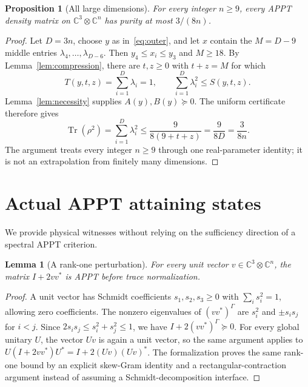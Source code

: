 \documentclass[11pt]{article}
\newtheorem{lemma}[theorem]{Lemma}
\newtheorem{proposition}[theorem]{Proposition}
\theoremstyle{remark}\newtheorem{remark}[theorem]{Remark}
\newcommand{\Tr}{\operatorname{Tr}}
\newcommand{\C}{\mathbb C}
\begin{document}
\begin{proposition}[All large dimensions]\label{prop:large}
For every integer $n\geq9$, every APPT density matrix on $\C^3\otimes\C^n$ has purity at most $3/(8n)$.
\end{proposition}
\begin{proof}
Let $D=3n$, choose $y$ as in~\eqref{eq:outer}, and let $x$ contain the $M=D-9$ middle entries $\lambda_4,\ldots,\lambda_{D-6}$. Then $y_4\leq x_i\leq y_3$ and $M\geq18$. By Lemma~\ref{lem:compression}, there are $t,z\geq0$ with $t+z=M$ for which
\[
 T(y,t,z)=\sum_{i=1}^D\lambda_i=1,\qquad
 \sum_{i=1}^D\lambda_i^2\leq S(y,t,z).
\]
Lemma~\ref{lem:necessity} supplies $A(y),B(y)\succeq0$. The uniform certificate therefore gives
\[
 \Tr(\rho^2)=\sum_{i=1}^D\lambda_i^2
 \leq\frac9{8(9+t+z)}=\frac9{8D}=\frac3{8n}.
\]
The argument treats every integer $n\geq9$ through one real-parameter identity; it is not an extrapolation from finitely many dimensions.
\end{proof}

\section{Actual APPT attaining states}\label{sec:attainment}
We provide physical witnesses without relying on the sufficiency direction of a spectral APPT criterion.

\begin{lemma}[A rank-one perturbation]\label{lem:rankone}
For every unit vector $v\in\C^3\otimes\C^n$, the matrix $I+2vv^*$ is APPT before trace normalization.
\end{lemma}
\begin{proof}
A unit vector has Schmidt coefficients $s_1,s_2,s_3\geq0$ with $\sum_i s_i^2=1$, allowing zero coefficients. The nonzero eigenvalues of $(vv^*)^\Gamma$ are $s_i^2$ and $\pm s_i s_j$ for $i<j$. Since $2s_i s_j\leq s_i^2+s_j^2\leq1$, we have $I+2(vv^*)^\Gamma\succeq0$. For every global unitary $U$, the vector $Uv$ is again a unit vector, so the same argument applies to $U(I+2vv^*)U^*=I+2(Uv)(Uv)^*$. The formalization proves the same rank-one bound by an explicit skew-Gram identity and a rectangular-contraction argument instead of assuming a Schmidt-decomposition interface.
\end{proof}
\end{document}
